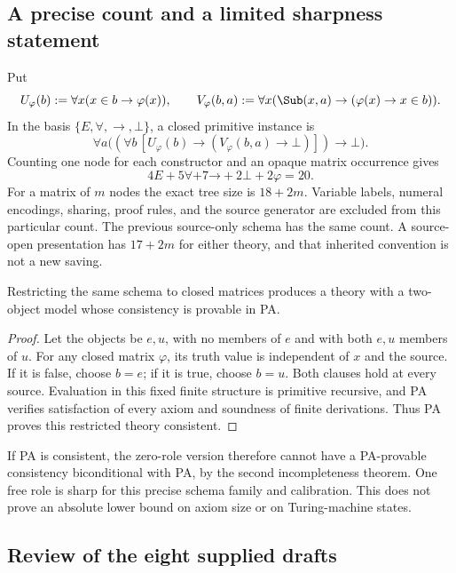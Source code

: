 \subsection{A precise count and a limited sharpness statement}

Put
\[
 U_\varphi(b):=\forall x(x\in b\to\varphi(x)),\qquad
 V_\varphi(b,a):=\forall x(\Sub(x,a)\to(\varphi(x)\to x\in b)).
\]
In the basis $\{E,\forall,\to,\bot\}$, a closed primitive instance is
\begin{equation}\label{eq:primitive}
 \forall a\bigl((\forall b\,[U_\varphi(b)\to
                         (V_\varphi(b,a)\to\bot)])\to\bot\bigr).
\end{equation}
Counting one node for each constructor and an opaque matrix occurrence gives
\[
     4E+5\forall+7\mathord\to+2\bot+2\varphi=20.
\]
For a matrix of $m$ nodes the exact tree size is $18+2m$. Variable labels, numeral encodings, sharing, proof rules, and the source generator are excluded from this particular count. The previous source-only schema has the same count. A source-open presentation has $17+2m$ for either theory, and that inherited convention is not a new saving.

\begin{proposition}\label{prop:closed-collapse}
Restricting the same schema to closed matrices produces a theory with a two-object model whose consistency is provable in PA.
\end{proposition}
\begin{proof}
Let the objects be $e,u$, with no members of $e$ and with both $e,u$ members of $u$. For any closed matrix $\varphi$, its truth value is independent of $x$ and the source. If it is false, choose $b=e$; if it is true, choose $b=u$. Both clauses hold at every source. Evaluation in this fixed finite structure is primitive recursive, and PA verifies satisfaction of every axiom and soundness of finite derivations. Thus PA proves this restricted theory consistent.
\end{proof}

If PA is consistent, the zero-role version therefore cannot have a PA-provable consistency biconditional with PA, by the second incompleteness theorem. One free role is sharp for this precise schema family and calibration. This does not prove an absolute lower bound on axiom size or on Turing-machine states.

\subsection{Review of the eight supplied drafts}

